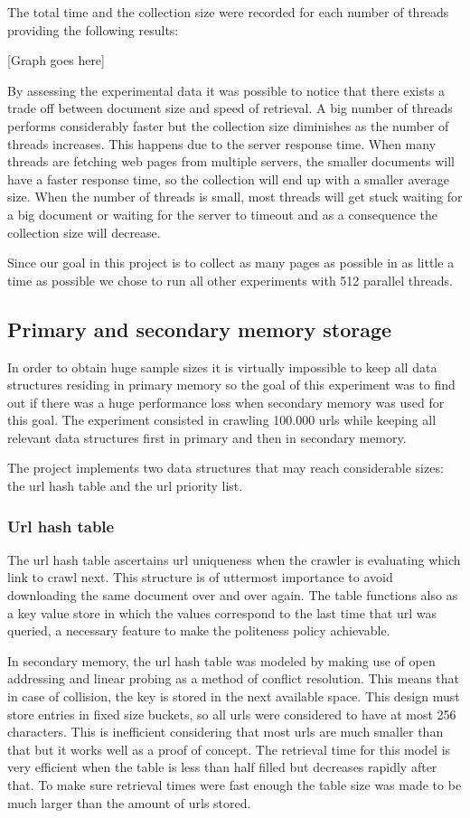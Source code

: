 \documentclass{acmart}
\begin{document}
The total time and the collection size were recorded for each number of threads providing the following results:

[Graph goes here]

By assessing the experimental data it was possible to notice that there exists a trade off between document size 
and speed of retrieval. A big number of threads performs considerably faster but the collection size diminishes 
as the number of threads increases.
This happens due to the server response time. When many threads are fetching web pages from multiple servers,
the smaller documents will have a faster response time, so the collection will end up with a smaller average size.
When the number of threads is small, most threads will get stuck waiting for a big document or waiting for the
server to timeout and as a consequence the collection size will decrease.

Since our goal in this project is to collect as many pages as possible in as little a time as possible
we chose to run all other experiments with 512 parallel threads.

\subsection{Primary and secondary memory storage}
In order to obtain huge sample sizes it is virtually impossible to keep all data structures residing in 
primary memory so the goal of this experiment was to find out if there was a huge performance loss when 
secondary memory was used for this goal.
The experiment consisted in crawling 100.000 urls while keeping all relevant data structures first in
primary and then in secondary memory.

The project implements two data structures that may reach considerable sizes: the url hash table and the 
url priority list.
  
\subsubsection{Url hash table}
The url hash table ascertains url uniqueness when the crawler is evaluating which link to crawl next. This
structure is of uttermost importance to avoid downloading the same document over and over again. The table
functions also as a key value store in which the values correspond to the last time that url was queried, a
necessary feature to make the politeness policy achievable.

In secondary memory, the url hash table was modeled by making use of open addressing and linear probing as
a method of conflict resolution. 
This means that in case of collision, the key is stored in the next available space. This design must
store entries in fixed size buckets, so all urls were considered to have at most 256 characters. This is 
inefficient considering that most urls are much smaller than that but it works well as a proof of concept. The retrieval
time for this model is very efficient when the table is less than half filled but decreases rapidly after that.
To make sure retrieval times were fast enough the table size was made to be much larger than the amount of urls stored.
\end{document}
